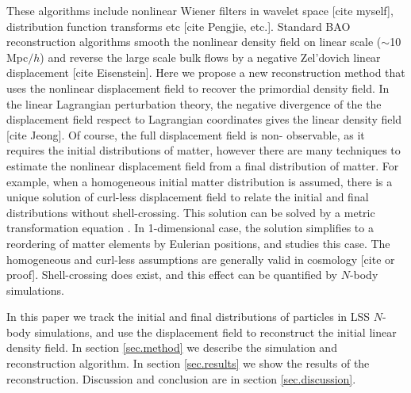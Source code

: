 \documentclass[aps,prd,twocolumn,superscriptaddress,amsfont,amssymb,amsmath,nofootinbib,showpacs,balancelastpage]{revtex4-1}
\begin{document}
These algorithms include nonlinear Wiener filters in wavelet space [cite myself], distribution 
function transforms etc [cite Pengjie, etc.]. Standard BAO reconstruction algorithms smooth the 
nonlinear density field on linear scale ($\sim$10 Mpc$/h$) and reverse the large 
scale bulk flows by a negative Zel'dovich linear displacement [cite Eisenstein]. Here we propose a 
new reconstruction method that uses the nonlinear displacement field to recover the 
primordial density field. In the linear Lagrangian perturbation theory, the 
negative divergence of the the displacement field respect to Lagrangian coordinates 
gives the linear density field [cite Jeong]. Of course, the full displacement field is non-
observable, as it requires the initial distributions of matter, however there are 
many techniques to estimate the nonlinear displacement field from a final 
distribution of matter. For example, when a homogeneous initial matter distribution 
is assumed, there is a unique solution of curl-less displacement field to relate 
the initial and final distributions without shell-crossing. This solution can be 
solved by a metric transformation equation \citep{1995ApJS..100..269P,1998ApJS..115...19P}. In 1-dimensional case, the solution simplifies to a reordering of 
matter elements by Eulerian positions, and \cite{2016arXiv160907041Z} studies this 
case. The homogeneous and curl-less assumptions are generally valid in cosmology 
[cite or proof]. Shell-crossing does exist, and this effect can be quantified by 
$N$-body simulations.

In this paper we track the initial and final distributions of particles in LSS $N$-
body simulations, and use the displacement field to reconstruct the initial linear 
density field. In section 
\ref{sec.method} we describe the simulation and reconstruction algorithm. In 
section \ref{sec.results} we show the results of the reconstruction. Discussion and 
conclusion are in section \ref{sec.discussion}.
\end{document}
